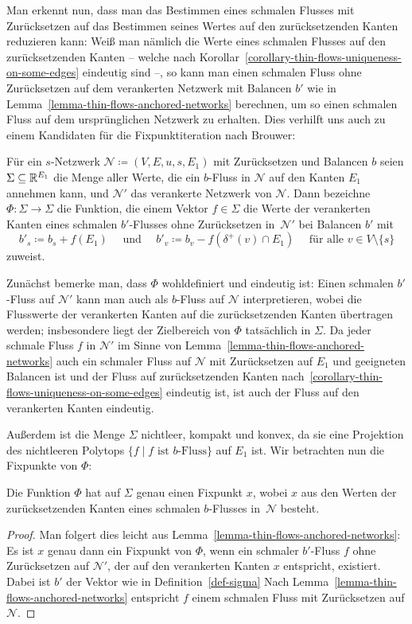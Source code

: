 Man erkennt nun, dass man das Bestimmen eines schmalen Flusses mit Zurück\-setzen auf das Bestimmen seines Wertes auf den zurücksetzenden Kanten reduzieren kann:
Weiß man nämlich die Werte eines schmalen Flusses auf den zurücksetzenden Kanten -- welche nach Korollar~\ref{corollary-thin-flows-uniqueness-on-some-edges} eindeutig sind --, so kann man einen schmalen Fluss ohne Zurücksetzen auf dem verankerten Netzwerk mit Balancen $b'$ wie in Lemma~\ref{lemma-thin-flows-anchored-networks} berechnen, um so einen schmalen Fluss auf dem ursprünglichen Netzwerk zu erhalten.
Dies verhilft uns auch zu einem Kandidaten für die Fixpunktiteration nach Brouwer:

\begin{definition}\label{def-sigma}
	Für ein $s$-Netzwerk $\mathcal{N} \coloneq (V, E, u, s, E_1)$ mit Zurücksetzen und Balancen $b$ seien $\Sigma\subseteq \mathbb{R}^{E_1}$ die Menge aller Werte, die ein $b$-Fluss in $\mathcal{N}$ auf den Kanten $E_1$ annehmen kann, und $\mathcal{N}'$ das verankerte Netzwerk von $\mathcal{N}$.
	Dann bezeichne $\Phi: \Sigma \rightarrow \Sigma$ die Funktion, die einem Vektor $f\in\Sigma$ die Werte der verankerten Kanten eines schmalen $b'$-Flusses ohne Zurücksetzen in~$\mathcal{N}'$ bei Balancen $b'$ mit
	\[
	b'_s \coloneq b_s + f(E_1) \text{~~~ und ~~~} b'_v \coloneq b_v - f( \delta^+(v)\cap E_1) \text{~~~ für alle $v\in V\setminus \{ s \}$}
	\]
	zuweist.
\end{definition}

Zunächst bemerke man, dass $\Phi$ wohldefiniert und eindeutig ist:
Einen schmalen $b'$-Fluss auf $\mathcal{N}'$ kann man auch als $b$-Fluss auf $\mathcal{N}$ interpretieren, wobei die Flusswerte der verankerten Kanten auf die zurücksetzenden Kanten übertragen werden; insbesondere liegt der Zielbereich von $\Phi$ tatsächlich in $\Sigma$.
Da jeder schmale Fluss $f$ in $\mathcal{N}'$ im Sinne von Lemma~\ref{lemma-thin-flows-anchored-networks} auch ein schmaler Fluss auf $\mathcal{N}$ mit Zurücksetzen auf $E_1$ und geeigneten Balancen ist und der Fluss auf zurücksetzenden Kanten nach~\ref{corollary-thin-flows-uniqueness-on-some-edges} eindeutig ist, ist auch der Fluss auf den verankerten Kanten eindeutig.

Außerdem ist die Menge $\Sigma$ nichtleer, kompakt und konvex, da sie eine Projektion des nichtleeren Polytops $\{ f \mid \text{$f$ ist $b$-Fluss} \}$ auf $E_1$ ist.
Wir betrachten nun die Fixpunkte von $\Phi$:
\begin{proposition}
	Die Funktion $\Phi$ hat auf $\Sigma$ genau einen Fixpunkt $x$, wobei $x$ aus den Werten der zurücksetzenden Kanten eines schmalen $b$-Flusses in~$\mathcal{N}$ besteht.
\end{proposition}
\begin{proof}
	Man folgert dies leicht aus Lemma~\ref{lemma-thin-flows-anchored-networks}:
	Es ist $x$ genau dann ein Fixpunkt von $\Phi$, wenn ein schmaler $b'$-Fluss $f$ ohne Zurücksetzen auf $\mathcal{N}'$, der auf den verankerten Kanten $x$ entspricht, existiert.
	Dabei ist $b'$ der Vektor wie in Definition~\ref{def-sigma}
	Nach Lemma~\ref{lemma-thin-flows-anchored-networks} entspricht $f$ einem schmalen Fluss mit Zurücksetzen auf $\mathcal{N}$.
\end{proof}

